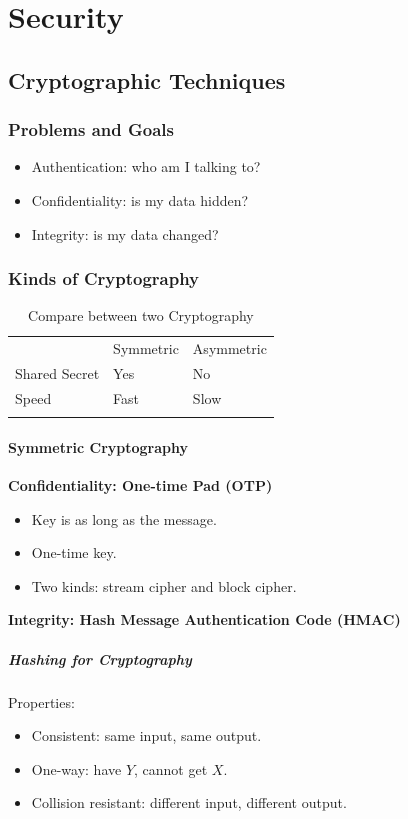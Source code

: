 \chapter{Security}

\section{Cryptographic Techniques}
\subsection{Problems and Goals}
\begin{itemize}
    \item Authentication: who am I talking to?
    \item Confidentiality: is my data hidden?
    \item Integrity: is my data changed?
\end{itemize}

\subsection{Kinds of Cryptography}
\begin{table}
\centering
\caption{Compare between two Cryptography}
\label{tab:1}
\begin{tabular}{lll}
\hline\noalign{\smallskip}
 & Symmetric & Asymmetric  \\
\noalign{\smallskip}\hline\noalign{\smallskip}
Shared Secret & Yes & No \\
Speed & Fast & Slow \\
\noalign{\smallskip}\hline
\end{tabular}
\end{table}

\subsubsection{Symmetric Cryptography}
\textbf{Confidentiality: One-time Pad (OTP)}
\begin{itemize}
    \item Key is as long as the message.
    \item One-time key.
    \item Two kinds: stream cipher and block cipher.
\end{itemize}

\textbf{Integrity: Hash Message Authentication Code (HMAC)}
\paragraph{Hashing for Cryptography}
Properties:
\begin{itemize}
    \item Consistent: same input, same output.
    \item One-way: have $Y$, cannot get $X$.
    \item Collision resistant: different input, different output.
\end{itemize}

